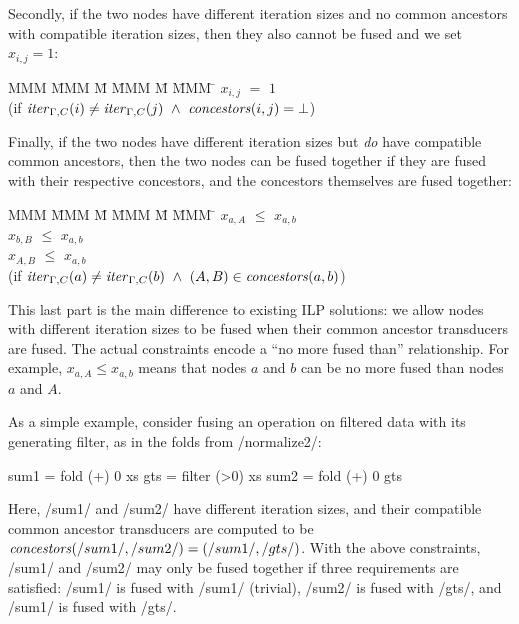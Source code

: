 Secondly, if the two nodes have different iteration sizes and no common ancestors with compatible iteration sizes, then they also cannot be fused and we set $x_{i,j} = 1$:
\begin{tabbing}
MMM     \= MMM \= M \= MMM \= M \= MMM \= \kill
        \> $x_{i,j}$   \> $=$   \> $1$          \>       \>     \\
        \> (if $\mathit{iter}_{\Gamma,C}(i) \not= \mathit{iter}_{\Gamma,C}(j) 
                ~\wedge~ \mathit{concestors}(i,j) = \bot$)
\end{tabbing}

Finally, if the two nodes have different iteration sizes but \emph{do} have compatible common ancestors, then the two nodes can be fused together if they are fused with their respective concestors, and the concestors themselves are fused together:
\begin{tabbing}
MMM     \= MMM \= M \= MMM \= M \= MMM \= \kill
        \> $x_{a,A}$   \> $\le$ \> $x_{a,b}$    \>       \>     \\
        \> $x_{b,B}$   \> $\le$ \> $x_{a,b}$    \>       \>     \\
        \> $x_{A,B}$   \> $\le$ \> $x_{a,b}$    \>       \>     \\
        \> (if $\mathit{iter}_{\Gamma,C}(a) \not= \mathit{iter}_{\Gamma,C}(b) 
                ~\wedge~ (A,B) \in \mathit{concestors}(a,b)$)
\end{tabbing}

This last part is the main difference to existing ILP solutions: we allow nodes with different iteration sizes to be fused when their common ancestor transducers are fused.
The actual constraints encode a ``no more fused than'' relationship.
For example, $x_{a,A} \le x_{a,b}$ means that nodes $a$ and $b$ can be no more fused than nodes $a$ and $A$. 

As a simple example, consider fusing an operation on filtered data with its generating filter, as in the folds from \Hs/normalize2/:
\begin{haskell}
    sum1 = fold (+) 0  xs
    gts  = filter (>0) xs
    sum2 = fold (+) 0  gts
\end{haskell}

Here, \Hs/sum1/ and \Hs/sum2/ have different iteration sizes, and their compatible common ancestor transducers are computed to be $\concestors(\Hs/sum1/, \Hs/sum2/) = (\Hs/sum1/, \Hs/gts/)$.
With the above constraints, \Hs/sum1/ and \Hs/sum2/ may only be fused together if three requirements are satisfied: \Hs/sum1/ is fused with \Hs/sum1/ (trivial), \Hs/sum2/ is fused with \Hs/gts/, and \Hs/sum1/ is fused with \Hs/gts/.

